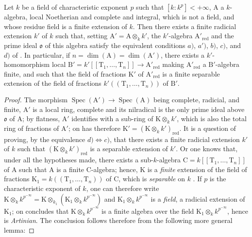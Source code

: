 \begin{corollary}[18.11.12]
\label{IV.18.11.12}
Let $k$ be a field of characteristic exponent $p$ such that $[k:k^p]<+\infty$, $\mathrm{A}$ a $k$-algebra, local Noetherian and complete and integral, which is not a field, and whose residue field is a finite extension of $k$.
Then there exists a finite radicial extension $k'$ of $k$ such that, setting $\mathrm{A}'=\mathrm{A}\otimes_kk'$, the $k'$-algebra $\mathrm{A}'_{\mathrm{red}}$ and the prime ideal $\mathfrak{o}$ of this algebra satisfy the equivalent conditions $a)$, $a')$, $b)$, $c)$, and $d)$ of .
In particular, if $n=\dim(\mathrm{A})=\dim(\mathrm{A}')$,
there exists a $k'$-homomorphism local $\mathrm{B}'=k'[[\mathrm{T}_1,\ldots,\mathrm{T}_n]]\to\mathrm{A}'_\mathrm{red}$ making $\mathrm{A}'_\mathrm{red}$ a $\mathrm{B}'$-algebra finite, and such that the field of fractions $\mathrm{K}'$ of $\mathrm{A}'_\mathrm{red}$ is a finite separable extension of the field of fractions $k'((\mathrm{T}_1,\ldots,\mathrm{T}_n))$ of $\mathrm{B}'$.
\end{corollary}

\begin{proof}
The morphism $\operatorname{Spec}(\mathrm{A}')\to\operatorname{Spec}(\mathrm{A})$ being complete, radicial, and finite, $\mathrm{A}'$ is a local ring, complete and its nilradical is the only prime ideal above $\mathfrak{o}$ of $\mathrm{A}$; by flatness, $\mathrm{A}'$ identifies with a sub-ring of $\mathrm{K}\otimes_kk'$, which is also the total ring of fractions of $\mathrm{A}'$; on has therefore $\mathrm{K}'=(\mathrm{K}\otimes_kk')_{\mathrm{red}}$.
It is a question of proving, by the equivalence $d)\Leftrightarrow c)$, that there exists a finite radicial extension $k'$ of $k$ such that $(\mathrm{K}\otimes_kk')_\mathrm{red}$ is a separable extension of $k'$.
Or one knows  that, under all the hypotheses made, there exists a sub-$k$-algebra $\mathrm{C}=k[[\mathrm{T}_1,\ldots,\mathrm{T}_n]]$ of $\mathrm{A}$ such that $\mathrm{A}$ is a finite $\mathrm{C}$-algebra; hence, $\mathrm{K}$ is a \emph{finite} extension of the field of fractions $\mathrm{K}_1=k((\mathrm{T}_1,\ldots,\mathrm{T}_n))$ of $\mathrm{C}$, which is \emph{separable} on $k$ .
If $p$ is the characteristic exponent of $k$, one can therefore write $\mathrm{K}\otimes_kk^{p^{-\infty}}=\mathrm{K}\otimes_{k_1}(\mathrm{K}_1\otimes_kk^{p^{-\infty}})$ and $\mathrm{K}_1\otimes_kk^{p^{-\infty}}$ is a \emph{field}, a radicial extension of $\mathrm{K}_1$; on concludes that $\mathrm{K}\otimes_kk^{p^{-\infty}}$ is a finite algebra over the field $\mathrm{K}_1\otimes_kk^{p^{-\infty}}$, hence is \emph{Artinian}.
The conclusion follows therefore from the following more general lemma:
\end{proof}


